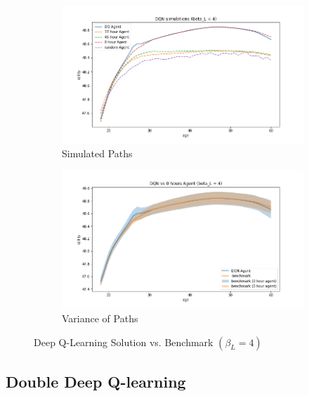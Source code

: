 \begin{figure}[ht]
\begin{subfigure}{.5\textwidth}
  \centering
  \includegraphics[width=1\linewidth]{figures/dqn_model1_beta_4_solution_benchmark_paths.png}
  \caption{Simulated Paths}
  \label{fig:dqn_solution_beta4_path}
\end{subfigure}%
\begin{subfigure}{.5\textwidth}
  \centering
  \includegraphics[width=1\linewidth]{figures/dqn_model1_beta_4_solution_benchmark_variance.png}
  \caption{Variance of Paths}
  \label{fig:dqn_solution_beta4_var}
\end{subfigure}
    \caption{Deep Q-Learning Solution vs. Benchmark $(\beta_L = 4)$}
    \label{fig:dqn_solution_beta4}
\end{figure}


\subsection{Double Deep Q-learning}

